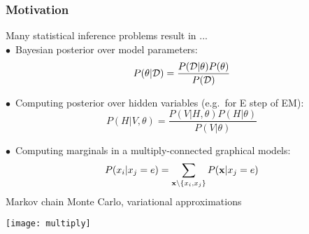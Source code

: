 

\newcommand{\xx}{\bfx}
\usepackage{algorithmic}
\newcommand{\qi}{q_{{\scriptscriptstyle\backslash} \!i}(\btheta)}





\begin{frame}
\frametitle{Motivation}

Many statistical inference problems result in ...\\

$\bullet\, $ 
Bayesian posterior over model parameters:
\[
P(\theta|\mathcal{D}) = \frac{P(\mathcal{D}|\theta) P(\theta)}{P(\mathcal{D})}
\]

$\bullet\, $ 
Computing posterior over hidden variables (e.g.\ for E step of EM):
\[
P(H|V,\theta) = \frac{P(V|H,\theta) P(H|\theta)}{P(V|\theta)}
\]

\parbox{3.5in}{
$\bullet\, $ 
Computing marginals in a multiply-connected graphical models:
\[
P(x_i|x_j = e) = \sum_{\xx \backslash \{ x_i, x_j\}} P(\xx|x_j = e)
\]
 Markov chain Monte Carlo, variational approximations
}
\parbox{1.1in}{\centerline{\texttt{[image: multiply]}}}

\end{frame}
